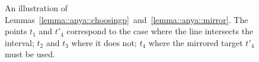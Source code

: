 \begin{figure}[tb]
  \begin{center}
    
  \end{center}
  \caption[Illustration of Lemmas~\ref{lemma::anya::choosingp}~and~\ref{lemma::anya::mirror}]
{\small 
An illustration of Lemmas~\ref{lemma::anya::choosingp}~and~\ref{lemma::anya::mirror}.  The points $t_1$ and $t'_4$ correspond to the case 
where the line intersects the interval; 
$t_2$ and $t_3$ where it does not; 
$t_4$ where the mirrored target $t'_4$ must be used.
}
\label{fig::anya::minf}
\end{figure}


